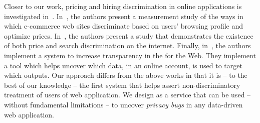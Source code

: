 Closer to our work, pricing and hiring discrimination in online applications is
investigated in~\cite{PriceDiscrimination,SearchDiscrimination,XRay}.
In~\cite{PriceDiscrimination}, the authors present a measurement study of the
ways in which e-commerce web sites discriminate based on users' browsing
profile and optimize prices. In~\cite{SearchDiscrimination},  the authors
present a study that demonstrates the existence of both price and search
discrimination on the internet. Finally, in~\cite{HiringDiscrimination}, the
authors implement a system to increase transparency in the for the Web. They
implement a tool which helps uncover which data, in an online account,
is used to target which outputs. Our approach differs from the above works in that
it is -- to the best of our knowledge -- the first system that helps assert
non-discriminatory treatment of users of web application. We design \sysname
as a service that can be used -- without fundamental limitations -- to
uncover {\em privacy bugs}  in any data-driven web application.
